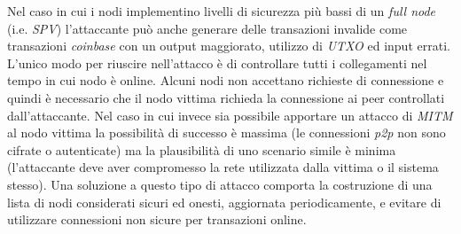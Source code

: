 Nel caso in cui i nodi implementino livelli di sicurezza più bassi di un \textit{full node} (i.e. \textit{SPV}) l'attaccante può anche generare delle transazioni invalide come transazioni \textit{coinbase} con un output maggiorato, utilizzo di \textit{UTXO} ed input errati.\newline
L'unico modo per riuscire nell'attacco è di controllare tutti i collegamenti nel tempo in cui nodo è online. Alcuni nodi non accettano richieste di connessione  e quindi è necessario che il nodo vittima richieda la connessione ai peer controllati dall'attaccante. Nel caso in cui invece sia possibile apportare un attacco di \textit{MITM} al nodo vittima la possibilità di successo è massima (le connessioni \textit{p2p} non sono cifrate o autenticate) ma la plausibilità di uno scenario simile è minima (l'attaccante deve aver compromesso la rete utilizzata dalla vittima o il sistema stesso).\newline
Una soluzione a questo tipo di attacco comporta la costruzione di una lista di nodi considerati sicuri ed onesti, aggiornata periodicamente, e evitare di utilizzare connessioni non sicure per transazioni online.


